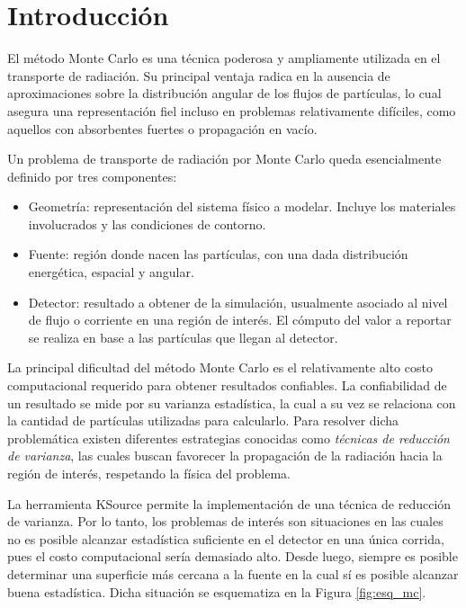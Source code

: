\section{Introducción}

El método Monte Carlo es una técnica poderosa y ampliamente utilizada en el transporte de radiación. Su principal ventaja radica en la ausencia de aproximaciones sobre la distribución angular de los flujos de partículas, lo cual asegura una representación fiel incluso en problemas relativamente difíciles, como aquellos con absorbentes fuertes o propagación en vacío.

Un problema de transporte de radiación por Monte Carlo queda esencialmente definido por tres componentes:
\begin{itemize}
    \item Geometría: representación del sistema físico a modelar. Incluye los materiales involucrados y las condiciones de contorno.
    \item Fuente: región donde nacen las partículas, con una dada distribución energética, espacial y angular.
    \item Detector: resultado a obtener de la simulación, usualmente asociado al nivel de flujo o corriente en una región de interés. El cómputo del valor a reportar se realiza en base a las partículas que llegan al detector.
\end{itemize}

La principal dificultad del método Monte Carlo es el relativamente alto costo computacional requerido para obtener resultados confiables. La confiabilidad de un resultado se mide por su varianza estadística, la cual a su vez se relaciona con la cantidad de partículas utilizadas para calcularlo. Para resolver dicha problemática existen diferentes estrategias conocidas como \emph{técnicas de reducción de varianza}, las cuales buscan favorecer la propagación de la radiación hacia la región de interés, respetando la física del problema.

La herramienta KSource permite la implementación de una técnica de reducción de varianza. Por lo tanto, los problemas de interés son situaciones en las cuales no es posible alcanzar estadística suficiente en el detector en una única corrida, pues el costo computacional sería demasiado alto. Desde luego, siempre es posible determinar una superficie más cercana a la fuente en la cual sí es posible alcanzar buena estadística. Dicha situación se esquematiza en la Figura \ref{fig:esq_mc}.

